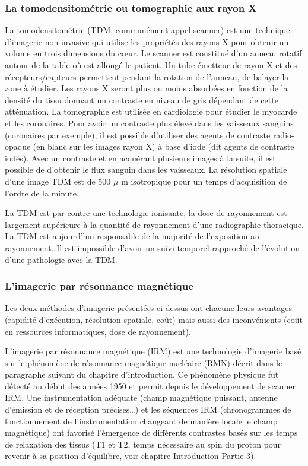 \clearpage
\subsubsection{La tomodensitométrie ou tomographie aux rayon X}

La tomodensitométrie (TDM, communément appel scanner) est une technique d’imagerie non invasive qui utilise les propriétés des rayons X pour obtenir un volume en trois dimensions du cœur.  Le scanner est constitué d’un anneau rotatif autour de la table où est allongé le patient. Un tube émetteur de rayon X et des récepteurs/capteurs permettent pendant la rotation de l'anneau, de balayer la zone à étudier. Les rayons X seront plus ou moins absorbées en fonction de la densité du tissu donnant un contraste en niveau de gris dépendant de cette atténuation. La tomographie est utilisée en cardiologie pour étudier le myocarde et les coronaires. Pour avoir un contraste plus élevé dans les vaisseaux sanguins (coronaires par exemple), il est possible d’utiliser des agents de contraste radio-opaque (en blanc sur les images rayon X) à base d’iode (dit agents de contraste iodés). Avec un contraste et en acquérant plusieurs images à la suite, il est possible de d’obtenir le flux sanguin dans les vaisseaux. La résolution spatiale d’une image TDM est de 500 $\mu$ m isotropique pour un temps d’acquisition de l’ordre de la minute.

La TDM est par contre une technologie ionisante, la dose de rayonnement est largement supérieure à la quantité de rayonnement d’une radiographie thoracique. La TDM est aujourd’hui responsable de la majorité de l’exposition au rayonnement. Il est impossible d’avoir un suivi temporel rapproché de l’évolution d’une pathologie avec la TDM.

\subsubsection{L’imagerie par résonnance magnétique }

Les deux méthodes d’imagerie présentées ci-dessus ont chacune leurs avantages (rapidité d’exécution, résolution spatiale, coût) mais aussi des inconvénients (coût en ressources informatiques, dose de rayonnement).

L’imagerie par résonnance magnétique (IRM) est une technologie d’imagerie basé sur le phénomène de résonnance magnétique nucléaire (RMN) décrit dans le paragraphe suivant du chapitre d’introduction. Ce phénomène physique fut détecté au début des années 1950 et permit depuis le développement de scanner IRM. Une instrumentation adéquate (champ magnétique puissant, antenne d’émission et de réception précises…) et les séquences IRM (chronogrammes de fonctionnement de l’instrumentation changeant de manière locale le champ magnétique) ont favorisé l’émergence de différents contrastes basés sur les temps de relaxation des tissus (T1 et T2, temps nécessaire au spin du proton pour revenir à sa position d’équilibre, voir chapitre Introduction Partie 3).

